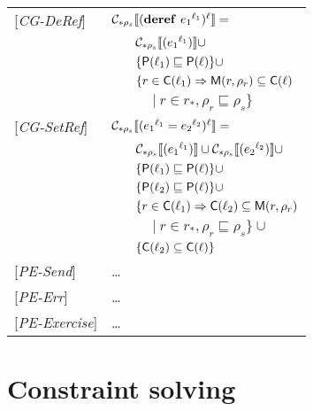 \begin{tabular} {l l l l}
{[\textit{CG-DeRef}]}&\multicolumn{3}{l}{$\mathcal{C}_{*\rho_s}\llbracket (\mathbf{deref}\ {e_1}^{\ell_1})^\ell \rrbracket = $}\\
&&\multicolumn{2}{l}{$ \mathcal{C}_{*\rho_s}\llbracket ({e_1}^{\ell_1}) \rrbracket \cup$}\\
&&\multicolumn{2}{l}{$\{ \mathsf{P}(\ell_1) \sqsubseteq \mathsf{P}(\ell) \} \cup$}\\
&&\multicolumn{2}{l}{$\{r \in \mathsf{C}(\ell_1) \Rightarrow \mathsf{M}(r, \rho_r) \subseteq \mathsf{C}(\ell)$} \\
&&&$|\ r \in r_*, \rho_r \sqsubseteq \rho_s\}$\\
{[\textit{CG-SetRef}]}&\multicolumn{3}{l}{$\mathcal{C}_{*\rho_s}\llbracket ({e_1}^{\ell_1} = {e_2}^{\ell_2})^\ell \rrbracket = $}\\
&&\multicolumn{2}{l}{$ \mathcal{C}_{*\rho_s}\llbracket ({e_1}^{\ell_1}) \rrbracket \cup \mathcal{C}_{*\rho_s}\llbracket ({e_2}^{\ell_2}) \rrbracket \cup $}\\
&&\multicolumn{2}{l}{$ \{ \mathsf{P}(\ell_1) \sqsubseteq \mathsf{P}(\ell) \} \cup$}\\
&&\multicolumn{2}{l}{$ \{ \mathsf{P}(\ell_2) \sqsubseteq \mathsf{P}(\ell) \} \cup$}\\
&&\multicolumn{2}{l}{$\{r \in \mathsf{C}(\ell_1) \Rightarrow \mathsf{C}(\ell_2) \subseteq \mathsf{M}(r, \rho_r)$}\\
&&&$|\ r \in r_*, \rho_r \sqsubseteq \rho_s\}\cup$ \\
&&\multicolumn{2}{l}{$\{ \mathsf{C}(\ell_2) \subseteq \mathsf{C}(\ell) \}$} \\
{[\textit{PE-Send}]}& \dots \\
{[\textit{PE-Err}]}& \dots \\
{[\textit{PE-Exercise}]}& \dots \\
\end{tabular}

\section{Constraint solving}
\label{sec:ConstraintSolving}


